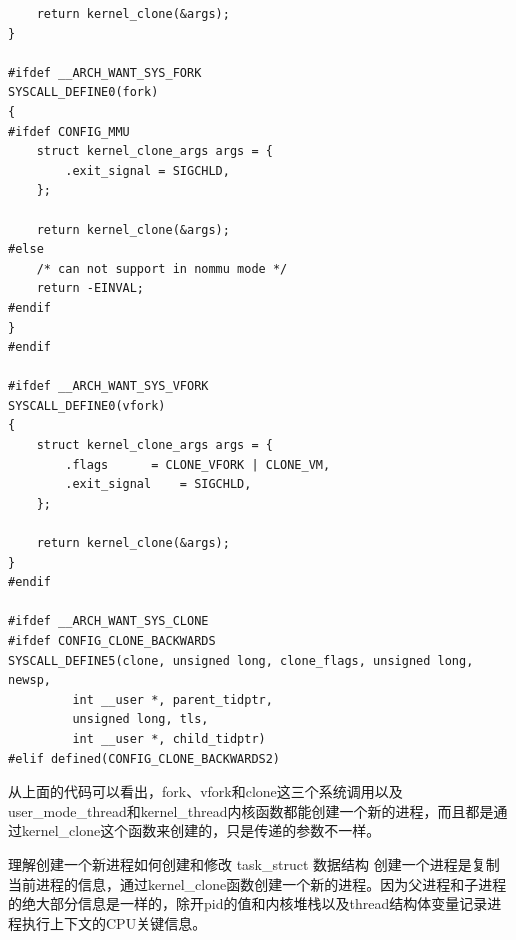 \documentclass[lang=cn,10pt]{elegantbook}
\begin{document}
\begin{lstlisting}
	return kernel_clone(&args);
}

#ifdef __ARCH_WANT_SYS_FORK
SYSCALL_DEFINE0(fork)
{
#ifdef CONFIG_MMU
	struct kernel_clone_args args = {
		.exit_signal = SIGCHLD,
	};

	return kernel_clone(&args);
#else
	/* can not support in nommu mode */
	return -EINVAL;
#endif
}
#endif

#ifdef __ARCH_WANT_SYS_VFORK
SYSCALL_DEFINE0(vfork)
{
	struct kernel_clone_args args = {
		.flags		= CLONE_VFORK | CLONE_VM,
		.exit_signal	= SIGCHLD,
	};

	return kernel_clone(&args);
}
#endif                                     

#ifdef __ARCH_WANT_SYS_CLONE
#ifdef CONFIG_CLONE_BACKWARDS
SYSCALL_DEFINE5(clone, unsigned long, clone_flags, unsigned long, newsp,
		 int __user *, parent_tidptr,
		 unsigned long, tls,
		 int __user *, child_tidptr)
#elif defined(CONFIG_CLONE_BACKWARDS2)

\end{lstlisting}
从上面的代码可以看出，fork、vfork和clone这三个系统调用以及user\_mode\_thread和kernel\_thread内核函数都能创建一个新的进程，而且都是通过kernel\_clone这个函数来创建的，只是传递的参数不一样。

理解创建一个新进程如何创建和修改 task\_struct 数据结构
创建一个进程是复制当前进程的信息，通过kernel\_clone函数创建一个新的进程。因为父进程和子进程的绝大部分信息是一样的，除开pid的值和内核堆栈以及thread结构体变量记录进程执行上下文的CPU关键信息。
\end{document}
